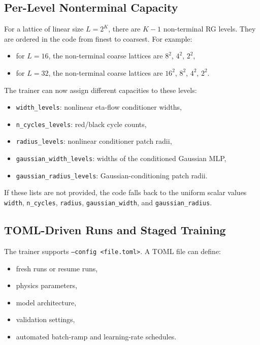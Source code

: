 \documentclass[11pt]{article}
\begin{document}
\subsection{Per-Level Nonterminal Capacity}

For a lattice of linear size $L=2^K$, there are $K-1$ non-terminal RG levels.
They are ordered in the code from finest to coarsest. For example:
\begin{itemize}
\item for $L=16$, the non-terminal coarse lattices are $8^2$, $4^2$, $2^2$,
\item for $L=32$, the non-terminal coarse lattices are $16^2$, $8^2$, $4^2$,
$2^2$.
\end{itemize}

The trainer can now assign different capacities to these levels:
\begin{itemize}
\item \texttt{width\_levels}: nonlinear eta-flow conditioner widths,
\item \texttt{n\_cycles\_levels}: red/black cycle counts,
\item \texttt{radius\_levels}: nonlinear conditioner patch radii,
\item \texttt{gaussian\_width\_levels}: widths of the conditioned Gaussian MLP,
\item \texttt{gaussian\_radius\_levels}: Gaussian-conditioning patch radii.
\end{itemize}

If these lists are not provided, the code falls back to the uniform scalar
values \texttt{width}, \texttt{n\_cycles}, \texttt{radius},
\texttt{gaussian\_width}, and \texttt{gaussian\_radius}.

\subsection{TOML-Driven Runs and Staged Training}

The trainer supports \texttt{--config <file.toml>}. A TOML file can define:
\begin{itemize}
\item fresh runs or resume runs,
\item physics parameters,
\item model architecture,
\item validation settings,
\item automated batch-ramp and learning-rate schedules.
\end{itemize}
\end{document}

